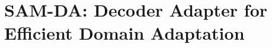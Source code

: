 \graphicspath{{appendices/}{sam_da/}{Figures/}}

\chapter[SAM-DA: Decoder Adapter]{SAM-DA: Decoder Adapter for Efficient Domain Adaptation}



